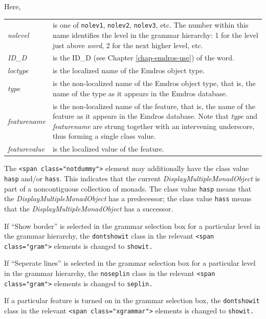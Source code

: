 \documentclass[11pt,oneside,a4paper]{memoir}
\newcommand*{\xml}[1]{\texttt{<#1>}}
\newcommand*{\xmla}[1]{\texttt{#1}} %
\begin{document}
\begin{minipage}{\textwidth}
Here,

\begin{tabu}{>{\itshape}lX}
nolevel & is one of \xmla{nolev1}, \xmla{nolev2}, \xmla{nolev3}, etc. The number within this
          name identifies the level in the grammar hierarchy: 1 for the level just above
          \emph{word}, 2 for the next higher level, etc.\\

ID\_D & is the ID\_D (see Chapter \ref{chap-emdros-use}) of the word.\\

loctype & is the localized name of the Emdros object type.\\

type & is the non-localized name of the Emdros object type, that is, the name of the type as it
appears in the Emdros database.\\

featurename & is the non-localized name of the feature, that is, the name of the feature as it
appears in the Emdros database. Note that \emph{type} and \emph{featurename} are strung together
with an intervening underscore, thus forming a single class value.\\

featurevalue & is the localized value of the feature.\\
\end{tabu}
\end{minipage}

The \xml{span class="notdummy"} element may additionally have the class value \xmla{hasp}
and/or \xmla{hass}. This indicates that the current \emph{DisplayMultipleMonadObject} is part of a
noncontiguous collection of monads. The class value \xmla{hasp} means that the
\emph{DisplayMultipleMonadObject} has a predecessor; the class value \xmla{hass} means that the
\emph{DisplayMultipleMonadObject} has a successor.


If ``Show border'' is selected in the grammar selection box for a particular level in the grammar
hierarchy, the \xmla{dontshowit} class in the relevant \xml{span class="gram"} elements is changed
to \xmla{showit.}

If ``Seperate lines'' is selected in the grammar selection box for a particular level in the grammar
hierarchy, the \xmla{noseplin} class in the relevant \xml{span class="gram"} elements is changed
to \xmla{seplin.}

If a particular feature is turned on in the grammar selection box, the \xmla{dontshowit} class in the
relevant \xml{span class="xgrammar"} elements is changed to \xmla{showit.}
\end{document}
